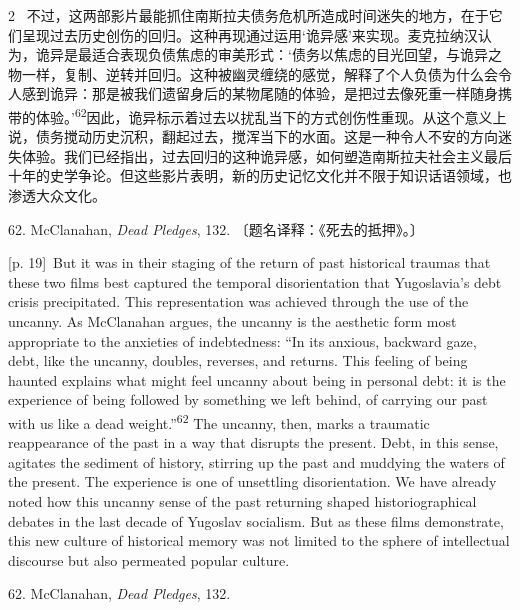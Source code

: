 \documentclass[10pt,a4paper]{article}
\begin{document}
\begin{paracol}{2}
\switchcolumn*
{\scriptsize\color{gray} [p. 19]}\ 不过，这两部影片最能抓住南斯拉夫债务危机所造成时间迷失的地方，在于它们呈现过去历史创伤的回归。这种再现通过运用‘诡异感’来实现。麦克拉纳汉认为，诡异是最适合表现负债焦虑的审美形式：‘债务以焦虑的目光回望，与诡异之物一样，复制、逆转并回归。这种被幽灵缠绕的感觉，解释了个人负债为什么会令人感到诡异：那是被我们遗留身后的某物尾随的体验，是把过去像死重一样随身携带的体验。’\nobreak\textsuperscript{62}因此，诡异标示着过去以扰乱当下的方式创伤性重现。从这个意义上说，债务搅动历史沉积，翻起过去，搅浑当下的水面。这是一种令人不安的方向迷失体验。我们已经指出，过去回归的这种诡异感，如何塑造南斯拉夫社会主义最后十年的史学争论。但这些影片表明，新的历史记忆文化并不限于知识话语领域，也渗透大众文化。\par{\small 62. McClanahan, \textit{Dead Pledges}, 132. 〔题名译释：《死去的抵押》。〕\par}
\switchcolumn
{\scriptsize\color{gray} [p. 19]}\ But it was in their staging of the return of past historical traumas that these two films best captured the temporal disorientation that Yugoslavia’s debt crisis precipitated. This representation was achieved through the use of the uncanny. As McClanahan argues, the uncanny is the aesthetic form most appropriate to the anxieties of indebtedness: “In its anxious, backward gaze, debt, like the uncanny, doubles, reverses, and returns. This feeling of being haunted explains what might feel uncanny about being in personal debt: it is the experience of being followed by something we left behind, of carrying our past with us like a dead weight.”\nobreak\textsuperscript{62} The uncanny, then, marks a traumatic reappearance of the past in a way that disrupts the present. Debt, in this sense, agitates the sediment of history, stirring up the past and muddying the waters of the present. The experience is one of unsettling disorientation. We have already noted how this uncanny sense of the past returning shaped historiographical debates in the last decade of Yugoslav socialism. But as these films demonstrate, this new culture of historical memory was not limited to the sphere of intellectual discourse but also permeated popular culture.\par{\small 62. McClanahan, \textit{Dead Pledges}, 132.\par}
\switchcolumn*

\end{paracol}
\end{document}

